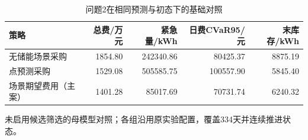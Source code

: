 \begin{table}[htbp]\centering\small
\caption{问题2在相同预测与初态下的基础对照}
\label{tab:v2_baselines}
\begin{tabularx}{\linewidth}{LRRRR}\toprule
策略 & 总费/万元 & 紧急量/kWh & 日费CVaR95/元 & 末库存/kWh\\\midrule
无储能场景采购 & 1854.80 & 242340.86 & 80425.37 & 8875.19\\
点预测采购 & 1529.08 & 505585.75 & 100557.90 & 5845.40\\
场景期望费用（主案） & 1401.28 & 85017.69 & 70731.74 & 6240.32\\
\bottomrule\end{tabularx}
\par\smallskip\parbox{\linewidth}{\footnotesize 未启用候选筛选的母模型对照；各组沿用原实验配置，覆盖334天并连续推进状态。}
\end{table}
